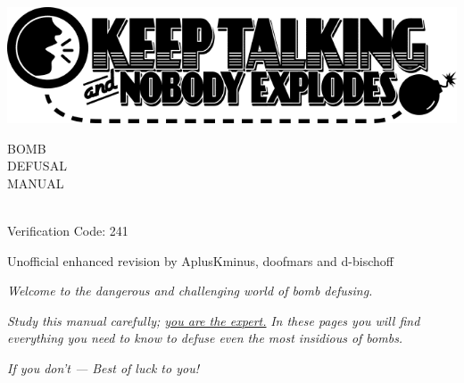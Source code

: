 \documentclass{../../ktane-mod}
\begin{document}
\thispagestyle{fancy}
\fancyhead{}
\vspace*{2cm}

\begin{center}
  \includegraphics[width=\textwidth]{../../../../resources/logo}

  \vspace{1cm}

  
  \fontsize{140pt}{120pt}\selectfont BOMB \\[-5pt]
  \fontsize{80pt}{70pt}\selectfont DEFUSAL \\[-5pt] 
  \fontsize{93pt}{80pt}\selectfont MANUAL

  \vspace{2cm}

  \fontsize{30pt}{30pt}\selectfont {\bfseries Version 1} \\[10pt]
  \fontsize{18pt}{18pt}\selectfont Verification Code: 241
\end{center}

\vfill

\begin{center}
  \normalsize Unofficial enhanced revision by AplusKminus, doofmars and d-bischoff
\end{center}

\clearpage
\vspace*{\fill}
\begin{minipage}[c]{0.9\textwidth}
  \begin{center}
    \setlength{\parskip}{10pt}
    \textit{Welcome to the dangerous and challenging world of bomb defusing.}

    \textit{Study this manual carefully; \uline{you are the expert.}}
    \textit{In these pages you will find everything you need to know to defuse even the most insidious of bombs.}

    \textit{If you don't — Best of luck to you!}
  \end{center}
\end{minipage}
\vfill %
\clearpage
\end{document}
